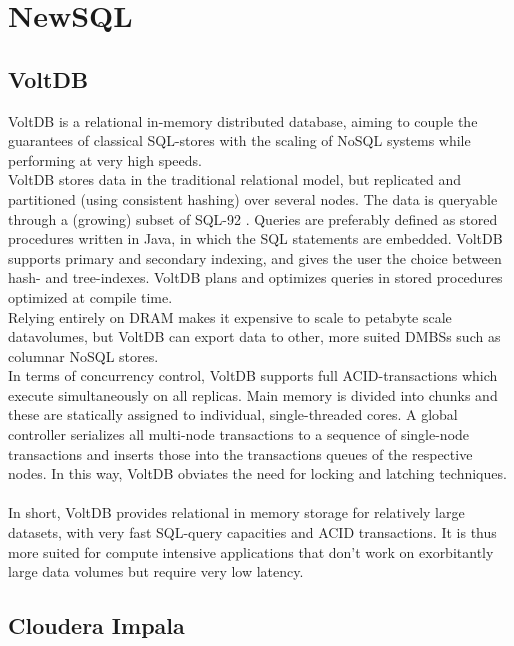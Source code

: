\documentclass{IEEEtran}
\begin{document}
\section{NewSQL}
\subsection{VoltDB}

VoltDB is a relational in-memory distributed database, aiming to couple the guarantees of classical SQL-stores with the scaling of NoSQL systems while performing at very high speeds\cite{stonebraker2013voltdb}.
\\VoltDB stores data in the traditional relational model, but replicated and partitioned (using consistent hashing) over several nodes\cite{grolinger2013data}. The data is queryable through a (growing) subset of SQL-92 \cite{voltdb2010voltdb}. Queries are preferably defined as stored procedures written in Java, in which the SQL statements are embedded. VoltDB supports primary and secondary indexing, and gives the user the choice between hash- and tree-indexes\cite{voltdb_indexes}. VoltDB plans and optimizes queries in stored procedures optimized at compile time\cite{voltdb_query_plans}.\\
Relying entirely on DRAM makes it expensive to scale to petabyte scale datavolumes, but VoltDB can export data to other, more suited DMBSs such as columnar NoSQL stores.
\\In terms of concurrency control, VoltDB supports full ACID-transactions which execute simultaneously on all replicas. Main memory is divided into chunks and these are statically assigned to individual, single-threaded cores. A global controller serializes all multi-node transactions to a sequence of single-node transactions and inserts those into the transactions queues of the respective nodes. In this way, VoltDB obviates the need for locking and latching techniques.
\\\\
In short, VoltDB provides relational in memory storage for relatively large datasets, with very fast SQL-query capacities and ACID transactions. It is thus more suited for compute intensive applications that don't work on exorbitantly large data volumes but require very low latency.

\subsection{Cloudera Impala}
\end{document}
